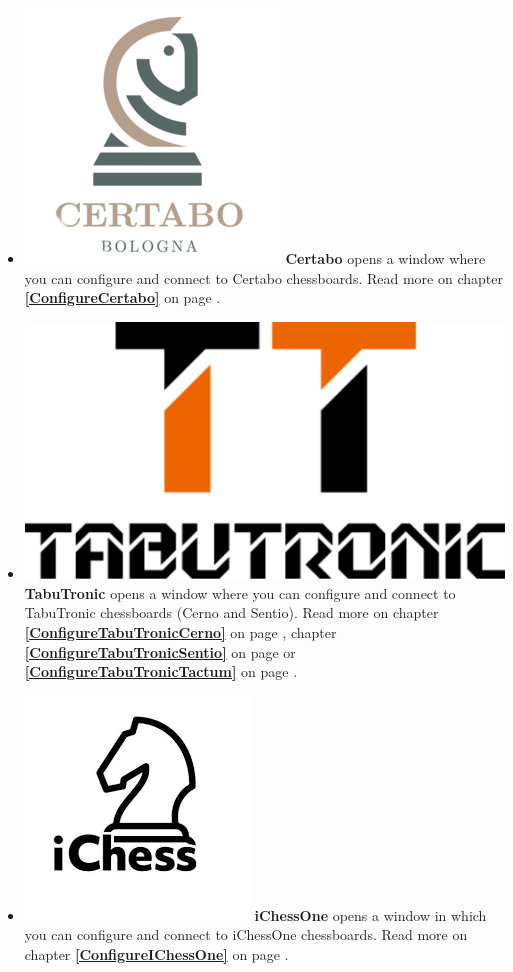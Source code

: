 \documentclass[11pt,a4paper]{article}
\begin{document}
	\begin{itemize}
		\item  \includegraphics[scale=0.1]{Certabo_icon.png} \textbf{Certabo} opens a window where you can configure and connect to Certabo chessboards.  Read more on chapter \textbf{\ref{ConfigureCertabo}  } on page \pageref{ConfigureCertabo}.
		\item  \includegraphics[scale=0.05]{tabutronic_logo_def.png} \textbf{TabuTronic} opens a window where you can configure and connect to TabuTronic chessboards (Cerno and Sentio). Read more on chapter \textbf{\ref{ConfigureTabuTronicCerno}  } on page \pageref{ConfigureTabuTronicCerno}, chapter \textbf{\ref{ConfigureTabuTronicSentio}  } on page \pageref{ConfigureTabuTronicSentio} or \textbf{\ref{ConfigureTabuTronicTactum}  } on page \pageref{ConfigureTabuTronicTactum}.	
		\item  \includegraphics[scale=0.1]{iChessOneIcon.png} \textbf{iChessOne} opens a window in which you can configure and connect to iChessOne chessboards.  Read more on chapter \textbf{\ref{ConfigureIChessOne}  } on page \pageref{ConfigureIChessOne}.    

\end{itemize}
\end{document}
